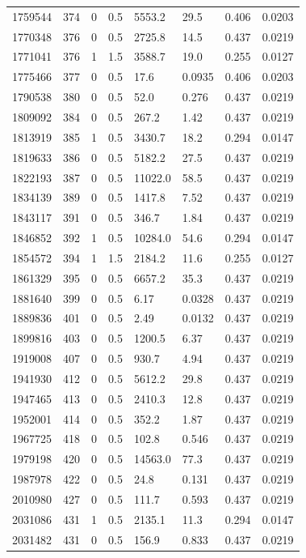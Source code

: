 \documentclass[preview]{standalone}
\begin{document}
{{{{\begin{tabular}{L{1.2cm}C{1.2cm} C{0.3cm}C{0.5cm} C{1.4cm}C{1.4cm} C{1.4cm}C{1.4cm}}
  1759544  &   374  & 0     & 0.5 &  5553.2  & 29.5  & 0.406 &  0.0203   \\ 
  1770348  &   376  & 0     & 0.5 &  2725.8  & 14.5  & 0.437 &  0.0219   \\ 
  1771041  &   376  & 1     & 1.5 &  3588.7  & 19.0  & 0.255 &  0.0127   \\ 
  1775466  &   377  & 0     & 0.5 &  17.6  & 0.0935  & 0.406 &  0.0203   \\ 
  1790538  &   380  & 0     & 0.5 &  52.0  & 0.276  & 0.437 &  0.0219   \\ 
  1809092  &   384  & 0     & 0.5 &  267.2  & 1.42  & 0.437 &  0.0219   \\ 
  1813919  &   385  & 1     & 0.5 &  3430.7  & 18.2  & 0.294 &  0.0147   \\ 
  1819633  &   386  & 0     & 0.5 &  5182.2  & 27.5  & 0.437 &  0.0219   \\ 
  1822193  &   387  & 0     & 0.5 &  11022.0  & 58.5  & 0.437 &  0.0219   \\ 
  1834139  &   389  & 0     & 0.5 &  1417.8  & 7.52  & 0.437 &  0.0219   \\ 
  1843117  &   391  & 0     & 0.5 &  346.7  & 1.84  & 0.437 &  0.0219   \\ 
  1846852  &   392  & 1     & 0.5 &  10284.0  & 54.6  & 0.294 &  0.0147   \\ 
  1854572  &   394  & 1     & 1.5 &  2184.2  & 11.6  & 0.255 &  0.0127   \\ 
  1861329  &   395  & 0     & 0.5 &  6657.2  & 35.3  & 0.437 &  0.0219   \\ 
  1881640  &   399  & 0     & 0.5 &  6.17  & 0.0328  & 0.437 &  0.0219   \\ 
  1889836  &   401  & 0     & 0.5 &  2.49  & 0.0132  & 0.437 &  0.0219   \\ 
  1899816  &   403  & 0     & 0.5 &  1200.5  & 6.37  & 0.437 &  0.0219   \\ 
  1919008  &   407  & 0     & 0.5 &  930.7  & 4.94  & 0.437 &  0.0219   \\ 
  1941930  &   412  & 0     & 0.5 &  5612.2  & 29.8  & 0.437 &  0.0219   \\ 
  1947465  &   413  & 0     & 0.5 &  2410.3  & 12.8  & 0.437 &  0.0219   \\ 
  1952001  &   414  & 0     & 0.5 &  352.2  & 1.87  & 0.437 &  0.0219   \\ 
  1967725  &   418  & 0     & 0.5 &  102.8  & 0.546  & 0.437 &  0.0219   \\ 
  1979198  &   420  & 0     & 0.5 &  14563.0  & 77.3  & 0.437 &  0.0219   \\ 
  1987978  &   422  & 0     & 0.5 &  24.8  & 0.131  & 0.437 &  0.0219   \\ 
  2010980  &   427  & 0     & 0.5 &  111.7  & 0.593  & 0.437 &  0.0219   \\ 
  2031086  &   431  & 1     & 0.5 &  2135.1  & 11.3  & 0.294 &  0.0147   \\ 
  2031482  &   431  & 0     & 0.5 &  156.9  & 0.833  & 0.437 &  0.0219   \\ 
\hline 
\end{tabular} 

}}}}
\end{document}
